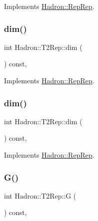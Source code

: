 Implements \mbox{\hyperlink{structHadron_1_1RepRep_a92c8802e5ed7afd7da43ccfd5b7cd92b}{Hadron\+::\+Rep\+Rep}}.

\mbox{\label{structHadron_1_1T2Rep_a06553069af895fb049a99d50612cba44}} 
\subsubsection{\texorpdfstring{dim()}{dim()}\hspace{0.1cm}{\footnotesize\ttfamily [4/5]}}
{\footnotesize\ttfamily int Hadron\+::\+T2\+Rep\+::dim (\begin{DoxyParamCaption}{ }\end{DoxyParamCaption}) const\hspace{0.3cm}{\ttfamily [inline]}, {\ttfamily [virtual]}}



Implements \mbox{\hyperlink{structHadron_1_1RepRep_a92c8802e5ed7afd7da43ccfd5b7cd92b}{Hadron\+::\+Rep\+Rep}}.

\mbox{\label{structHadron_1_1T2Rep_a06553069af895fb049a99d50612cba44}} 
\subsubsection{\texorpdfstring{dim()}{dim()}\hspace{0.1cm}{\footnotesize\ttfamily [5/5]}}
{\footnotesize\ttfamily int Hadron\+::\+T2\+Rep\+::dim (\begin{DoxyParamCaption}{ }\end{DoxyParamCaption}) const\hspace{0.3cm}{\ttfamily [inline]}, {\ttfamily [virtual]}}



Implements \mbox{\hyperlink{structHadron_1_1RepRep_a92c8802e5ed7afd7da43ccfd5b7cd92b}{Hadron\+::\+Rep\+Rep}}.

\mbox{\label{structHadron_1_1T2Rep_a909c7165132829f8e1b837f7afa00e61}} 
\subsubsection{\texorpdfstring{G()}{G()}\hspace{0.1cm}{\footnotesize\ttfamily [1/3]}}
{\footnotesize\ttfamily int Hadron\+::\+T2\+Rep\+::G (\begin{DoxyParamCaption}{ }\end{DoxyParamCaption}) const\hspace{0.3cm}{\ttfamily [inline]}, {\ttfamily [virtual]}}

